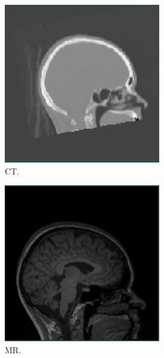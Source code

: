 \begin{figure}[H]
    \centering
    \begin{subfigure}{0.3\textwidth}
        \centering
        \includegraphics[width=0.75\textwidth]{billeder/ct.png}
        \caption{CT.}
        \label{eksempel:ct}
    \end{subfigure}\hfill
    \begin{subfigure}{0.3\textwidth}
        \centering
        \includegraphics[width=0.75\textwidth]{billeder/mr.png}
        \caption{MR.}
        \label{eksempel:mr}
    \end{subfigure}\hfill
    \begin{subfigure}{0.3\textwidth}
        \centering

\end{subfigure}
\end{figure}
